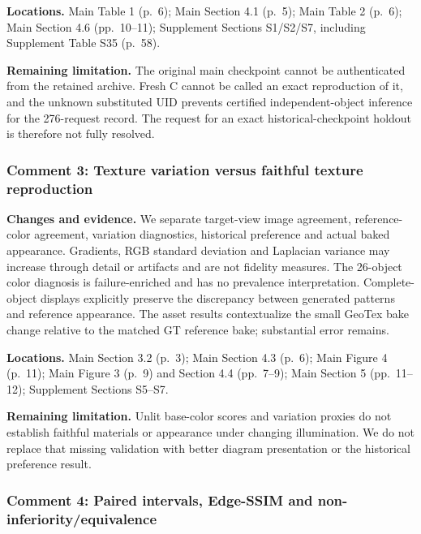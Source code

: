 \documentclass[
  10pt,
]{article}
\begin{document}
\textbf{Locations.} Main Table 1 (p.~6); Main Section 4.1 (p.~5); Main
Table 2 (p.~6); Main Section 4.6 (pp.~10--11); Supplement Sections
S1/S2/S7, including Supplement Table S35 (p.~58).

\textbf{Remaining limitation.} The original main checkpoint cannot be
authenticated from the retained archive. Fresh C cannot be called an
exact reproduction of it, and the unknown substituted UID prevents
certified independent-object inference for the 276-request record. The
request for an exact historical-checkpoint holdout is therefore not
fully resolved.

\hypertarget{comment-3-texture-variation-versus-faithful-texture-reproduction}{%
\subsubsection{Comment 3: Texture variation versus faithful texture
reproduction}\label{comment-3-texture-variation-versus-faithful-texture-reproduction}}

\textbf{Changes and evidence.} We separate target-view image agreement,
reference-color agreement, variation diagnostics, historical preference
and actual baked appearance. Gradients, RGB standard deviation and
Laplacian variance may increase through detail or artifacts and are not
fidelity measures. The 26-object color diagnosis is failure-enriched and
has no prevalence interpretation. Complete-object displays explicitly
preserve the discrepancy between generated patterns and reference
appearance. The asset results contextualize the small GeoTex bake change
relative to the matched GT reference bake; substantial error remains.

\textbf{Locations.} Main Section 3.2 (p.~3); Main Section 4.3 (p.~6);
Main Figure 4 (p.~11); Main Figure 3 (p.~9) and Section 4.4 (pp.~7--9);
Main Section 5 (pp.~11--12); Supplement Sections S5--S7.

\textbf{Remaining limitation.} Unlit base-color scores and variation
proxies do not establish faithful materials or appearance under changing
illumination. We do not replace that missing validation with better
diagram presentation or the historical preference result.

\hypertarget{comment-4-paired-intervals-edge-ssim-and-non-inferiorityequivalence}{%
\subsubsection{Comment 4: Paired intervals, Edge-SSIM and
non-inferiority/equivalence}\label{comment-4-paired-intervals-edge-ssim-and-non-inferiorityequivalence}}
\end{document}
